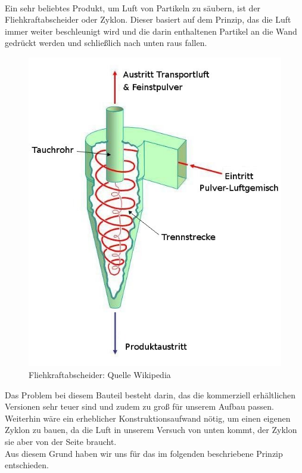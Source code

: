 \hfill \\

Ein sehr beliebtes Produkt, um Luft von Partikeln zu säubern, ist der Fliehkraftabscheider oder Zyklon. Dieser basiert auf dem Prinzip, das die Luft immer weiter beschleunigt wird und die darin enthaltenen Partikel an die Wand gedrückt werden und schließlich nach unten raus fallen. \\


\begin{figure}[h]
	\begin{center}
		\includegraphics[scale=0.4]{Umsetzung_Fliehkraftabscheider.jpg}
		\caption{Fliehkraftabscheider: Quelle Wikipedia}
	\end{center}
\end{figure}



Das Problem bei diesem Bauteil besteht darin, das die kommerziell erhältlichen Versionen sehr teuer sind und zudem zu groß für unserem Aufbau passen. \\
Weiterhin wäre ein erheblicher Konstruktionsaufwand nötig, um einen eigenen Zyklon zu bauen, da die Luft in unserem Versuch von unten kommt, der Zyklon sie aber von der Seite braucht. \\
Aus diesem Grund haben wir uns für das im folgenden beschriebene Prinzip entschieden.


